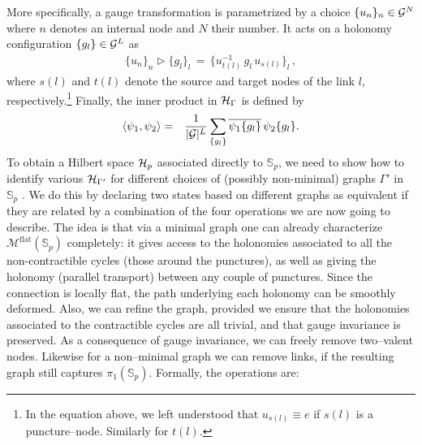 \documentclass[nofootinbib,superscriptaddress,eqsecnum,tightenlines,11pt]{revtex4-1}
\def\ba{\begin{eqnarray}}
\def\ea{\end{eqnarray}}
\renewcommand{\S}{{\mathbb S}}
\begin{document}
More specifically, a gauge transformation is parametrized by a choice $\{u_n\}_n \in {\cal G}^N$ where $n$ denotes an internal node and $N$ their number.
It acts on a holonomy configuration  $\{g_l\} \in {\cal G}^L$ as
\ba
\{u_n\}_n \triangleright  \{g_l\}_l \,=\, \{u^{-1}_{t(l)} \,g_l \, u_{s(l)} \}_l \, ,
\ea
where $s(l)$ and $t(l)$ denote the source and target nodes of the link $l$, respectively.\footnote{In the equation above, we left understood that $u_{s(l)}\equiv e$ if $s(l)$ is a puncture--node. Similarly for $t(l)$.}
Finally, the inner product in ${\cal H}_\Gamma$ is defined by
\ba\label{innprod1}
\langle \psi_1, \psi_2\rangle  &=& \frac{1}{|{\cal G}|^{L}} \sum_{\{g_l\}} \overline{\psi_1 \{g_l\}} \, \psi_2\{g_l\} .
\ea
To obtain a Hilbert space ${\cal H}_p$ associated directly to $\S_p$, we need to show how to identify various ${\cal H}_{\Gamma'}$ for different choices of (possibly non-minimal) graphs  $\Gamma'$ in $\S_p$ .
We do this by declaring two states based on different graphs as equivalent if they are related by a combination of the four operations we are now going to describe.
The idea is that via a minimal graph one can already characterize $\mathcal{M}^\text{flat}(\S_p)$ completely:
it gives access to the holonomies associated to all the non-contractible cycles (those around the punctures), as well as giving the holonomy (parallel transport) between any couple of punctures.
Since the connection is locally flat, the path underlying each holonomy can be smoothly deformed.
Also, we can refine the graph, provided we ensure that the holonomies associated to the contractible cycles are all trivial, and that gauge invariance is preserved.
As a consequence of gauge invariance, we can freely remove two--valent nodes.
Likewise for a non--minimal graph we can remove links, if the resulting graph still captures $\pi_1(\S_p)$. 
Formally, the operations are:
\end{document}
